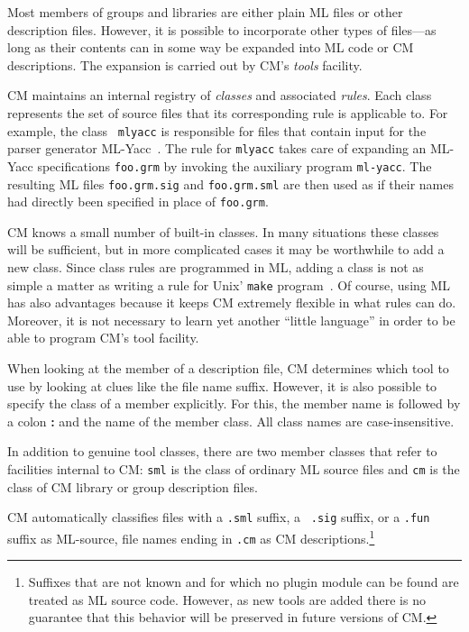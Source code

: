 \documentclass[titlepage,letterpaper]{article}
\begin{document}
Most members of groups and libraries are either plain ML files or
other description files.  However, it is possible to incorporate other
types of files---as long as their contents can in some way be expanded
into ML code or CM descriptions.  The expansion is carried out by CM's
{\it tools} facility.

CM maintains an internal registry of {\em classes} and associated {\em
rules}.  Each class represents the set of source files that its
corresponding rule is applicable to.  For example, the class {\tt
mlyacc} is responsible for files that contain input for the parser
generator ML-Yacc~\cite{tarditi90:yacc}.  The rule for {\tt mlyacc}
takes care of expanding an ML-Yacc specifications {\tt foo.grm} by
invoking the auxiliary program {\tt ml-yacc}.  The resulting ML files
{\tt foo.grm.sig} and {\tt foo.grm.sml} are then used as if their
names had directly been specified in place of {\tt foo.grm}.

CM knows a small number of built-in classes.  In many situations these
classes will be sufficient, but in more complicated cases it may be
worthwhile to add a new class.  Since class rules are programmed in
ML, adding a class is not as simple a matter as writing a rule for
{\sc Unix}' {\tt make} program~\cite{feldman79}.  Of course,
using ML has also advantages because it keeps CM extremely flexible in
what rules can do.  Moreover, it is not necessary to learn yet another
``little language'' in order to be able to program CM's tool facility.

When looking at the member of a description file, CM determines which
tool to use by looking at clues like the file name suffix.  However,
it is also possible to specify the class of a member explicitly.  For
this, the member name is followed by a colon {\bf :} and the name of
the member class.  All class names are case-insensitive.

In addition to genuine tool classes, there are two member classes
that refer to facilities internal to CM: {\tt sml} is the class of
ordinary ML source files and {\tt cm} is the class of CM library or
group description files.

CM automatically classifies files with a {\tt .sml} suffix, a {\tt
.sig} suffix, or a {\tt .fun} suffix as ML-source, file names ending
in {\tt .cm} as CM descriptions.\footnote{Suffixes that are not known
and for which no plugin module can be found are treated as ML source
code.  However, as new tools are added there is no guarantee that
this behavior will be preserved in future versions of CM.}
\end{document}
